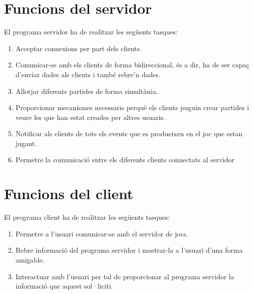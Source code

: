 \section{Funcions del servidor}

El programa servidor ha de realitzar les següents tasques:

\begin{enumerate}
	\item{Acceptar connexions per part dels clients.}
	\item{Comunicar-se amb els clients de forma bidireccional, és a dir, ha de ser capaç d'enviar dades als clients  i també rebre'n dades.}
	\item{Allotjar diferents partides de forma simultània.}
	\item{Proporcionar mecanismes necessaris perquè els clients puguin crear partides i veure les que han estat creades per altres usuaris.}
	\item{Notificar als clients de tots els events que es produeixen en el joc que estan jugant.}
	\item{Permetre la comunicació entre els diferents clients connectats al servidor}	
\end{enumerate}

\section{Funcions del client}

El programa client ha de realitzar les següents tasques: 

\begin{enumerate}
	\item{Permetre a l'usuari comunicar-se amb el servidor de jocs.}
	\item{Rebre informació del programa servidor i mostrar-la a l'usuari d'una forma amigable.}
	\item{Interactuar amb l'usuari per tal de proporcionar al programa servidor la informació que aquest sol·liciti.}	
\end{enumerate}


